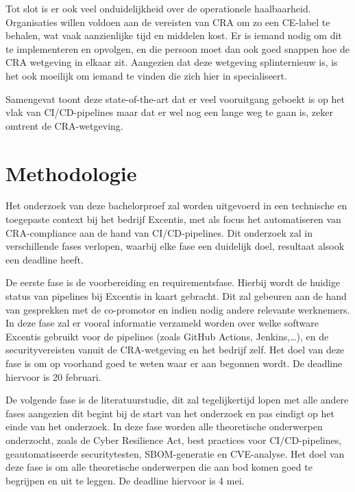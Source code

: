 Tot slot is er ook veel onduidelijkheid over de operationele haalbaarheid. Organisaties willen voldoen aan de vereisten van CRA om zo een CE-label te behalen, wat vaak aanzienlijke tijd en middelen kost. Er is iemand nodig om dit te implementeren en opvolgen, en die persoon moet dan ook goed snappen hoe de CRA wetgeving in elkaar zit. Aangezien dat deze wetgeving splinternieuw is, is het ook moeilijk om iemand te vinden die zich hier in specialiseert.

Samengevat toont deze state-of-the-art dat er veel vooruitgang geboekt is op het vlak van CI/CD-pipelines maar dat er wel nog een lange weg te gaan is, zeker omtrent de CRA-wetgeving.




\section{Methodologie}%
\label{sec:methodologie}

Het onderzoek van deze bachelorproef zal worden uitgevoerd in een technische en toegepaste context bij het bedrijf Excentis, met als focus het automatiseren van CRA-compliance aan de hand van CI/CD-pipelines. Dit onderzoek zal in verschillende fases verlopen, waarbij elke fase een duidelijk doel, resultaat alsook een deadline heeft. 

De eerste fase is de voorbereiding en requirementsfase. Hierbij wordt de huidige status van pipelines bij Excentis in kaart gebracht. Dit zal gebeuren aan de hand van gesprekken met de co-promotor en indien nodig andere relevante werknemers. In deze fase zal er vooral informatie verzameld worden over welke software Excentis gebruikt voor de pipelines (zoals GitHub Actions, Jenkins,…), en de securityvereisten vanuit de CRA-wetgeving en het bedrijf zelf. Het doel van deze fase is om op voorhand goed te weten waar er aan begonnen wordt. De deadline hiervoor is 20 februari. 

De volgende fase is de literatuurstudie, dit zal tegelijkertijd lopen met alle andere fases aangezien dit begint bij de start van het onderzoek en pas eindigt op het einde van het onderzoek. In deze fase worden alle theoretische onderwerpen onderzocht, zoals de Cyber Resilience Act, best practices voor CI/CD-pipelines, geautomatiseerde securitytesten, SBOM-generatie en CVE-analyse. Het doel van deze fase is om alle theoretische onderwerpen die aan bod komen goed te begrijpen en uit te leggen. De deadline hiervoor is 4 mei. 

